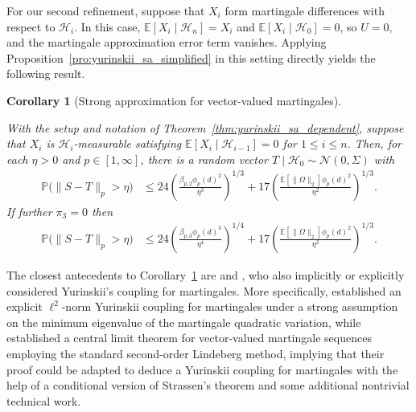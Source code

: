 \documentclass[11pt,lof]{puthesis}
\renewcommand{\P}{\ensuremath{\mathbb{P}}}
\newcommand{\E}{\ensuremath{\mathbb{E}}}
\newcommand{\cH}{\ensuremath{\mathcal{H}}}
\newcommand{\cN}{\ensuremath{\mathcal{N}}}
\theoremstyle{break}
\newtheorem{corollary}{Corollary}[section]
\theoremstyle{proof}
\begin{document}
For our second refinement, suppose that
$X_i$ form martingale differences with respect to $\cH_i$.
In this case, $\E[X_i \mid \cH_n] = X_i$ and $\E[X_i \mid \cH_0] = 0$,
so $U = 0$, and the martingale approximation error term vanishes.
Applying Proposition~\ref{pro:yurinskii_sa_simplified} in this setting
directly yields the following result.
%
\begin{corollary}[Strong approximation for vector-valued martingales]%
  \label{cor:yurinskii_sa_martingale}

  With the setup and notation of Theorem~\ref{thm:yurinskii_sa_dependent},
  suppose that
  $X_i$ is $\cH_i$-measurable satisfying $\E[X_i \mid \cH_{i-1}] = 0$ for
  $1 \leq i \leq n$. Then, for each $\eta > 0$ and $p \in [1,\infty]$, there is
  a random vector $T \mid \cH_0 \sim \cN(0, \Sigma)$ with
  \begin{align}
    \label{eq:yurinskii_sa_martingale_order_2}
    \P\big(\|S-T\|_p > \eta\big)
    &\leq
    24 \left(
      \frac{\beta_{p,2} \phi_p(d)^2}{\eta^3}
    \right)^{1/3}
    + 17 \left(
      \frac{\E \left[ \|\Omega\|_2 \right] \phi_p(d)^2}{\eta^2}
    \right)^{1/3}.
  \end{align}
  If further $\pi_3 = 0$ then
  \begin{align}
    \label{eq:yurinskii_sa_martingale_order_3}
    \P\big(\|S-T\|_p > \eta\big)
    &\leq
    24 \left(
      \frac{\beta_{p,3} \phi_p(d)^3}{\eta^4}
    \right)^{1/4}
    + 17 \left(
      \frac{\E \left[ \|\Omega\|_2 \right] \phi_p(d)^2}{\eta^2}
    \right)^{1/3}.
  \end{align}
\end{corollary}

The closest antecedents to Corollary~\ref{cor:yurinskii_sa_martingale} are
\citet{belloni2018high} and \citet{li2020uniform}, who also implicitly or
explicitly considered Yurinskii's coupling for martingales. More specifically,
\citet[Theorem~1]{li2020uniform} established an explicit
$\ell^2$-norm Yurinskii coupling
for martingales under a strong assumption on the minimum eigenvalue of the
martingale quadratic variation, while \citet[Theorem~2.1]{belloni2018high}
established a central limit theorem for vector-valued martingale sequences
employing the standard second-order Lindeberg method, implying that their proof
could be adapted to deduce a Yurinskii coupling for martingales with the help
of a conditional version of Strassen's theorem \citep{chen2020jackknife} and
some additional nontrivial technical work.
\end{document}
